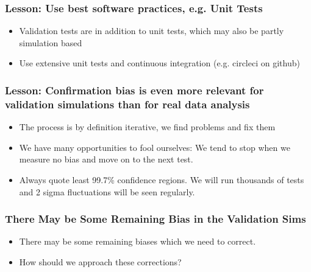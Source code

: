 \documentclass{beamer}
\begin{document}
\frame
{
    \frametitle{Lesson: Use best software practices, e.g. Unit Tests}

    \begin{itemize}

        \item Validation tests are in addition to unit tests, which may also be
            partly simulation based

        \item Use extensive unit tests and continuous integration (e.g. circleci
            on github)

    \end{itemize}

}

\frame
{

    \frametitle{Lesson: Confirmation bias is even more relevant for validation
    simulations than for real data analysis }

    \begin{itemize}

        \item The process is by definition iterative, we find problems and fix
            them

        \item We have many opportunities to fool ourselves:  We tend to stop when we
            measure no bias and move on to the next test.

        \item Always quote least 99.7\% confidence regions.  We will run
            thousands of tests and 2 sigma fluctuations will be seen regularly.

    \end{itemize}

}

\frame
{

    \frametitle{There May be Some Remaining Bias in the Validation Sims}

    \begin{itemize}

        \item There may be some remaining biases which we need to correct.

        \item How should we approach these corrections?

    \end{itemize}

}
\end{document}
